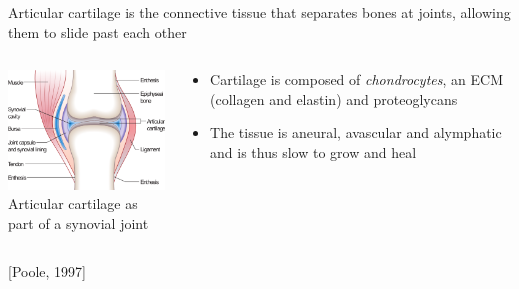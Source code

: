 \documentclass{beamer}
\newcommand{\references}[1] {
  \begin{flushright}
    \scriptsize [#1] \normalsize
  \end{flushright}
}
\begin{document}
\begin{frame}{Articular cartilage is the connective tissue that
    separates bones at joints, allowing them to slide past each other}

  \begin{columns}

    \begin{column}{6cm}
      \begin{center}
      \includegraphics[width=6cm]{../images/pdf/joint}
      {\\[-0.1cm] \scriptsize Articular cartilage as part of a
        synovial joint}
      \end{center}
    \end{column}

    \begin{column}{6cm}
      \begin{itemize}
      \item <1-> Cartilage is composed of {\em chondrocytes}, an ECM
        (collagen and elastin) and proteoglycans\\[0.5cm]
        \pause
      \item<2-> The tissue is aneural, avascular and alymphatic and is
        thus slow to grow and heal
      \end{itemize}
    \end{column}

  \end{columns}

  \references{Poole, 1997}

\end{frame}
\end{document}
